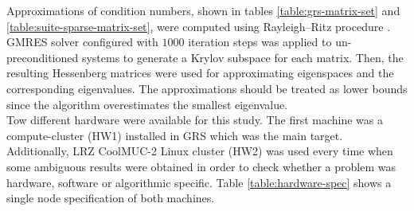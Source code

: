 Approximations of condition numbers, shown in tables \ref{table:grs-matrix-set} and \ref{table:suite-sparse-matrix-set},  were computed using Rayleigh–Ritz procedure \cite{rayleigh-ritz-procedure}. GMRES solver configured with $1000$ iteration steps was applied to un-preconditioned systems to generate a Krylov subspace for each matrix. Then, the resulting Hessenberg matrices were used for approximating eigenspaces and the corresponding eigenvalues. The approximations should be treated as lower bounds since the algorithm overestimates the smallest eigenvalue.\\




Tow different hardware were available for this study. The first machine was a compute-cluster (HW1) installed in GRS which was the main target. Additionally, LRZ CoolMUC-2 Linux cluster (HW2) was used every time when some ambiguous results were obtained in order to check whether a problem was hardware, software or algorithmic specific. Table \ref{table:hardware-spec} shows a single node specification of both machines.\\


